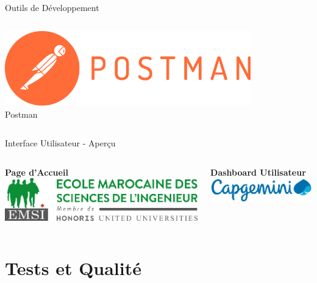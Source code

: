 \documentclass[aspectratio=169]{beamer}
\begin{document}
\begin{frame}{Outils de Développement}
\begin{columns}
        \begin{center}
            \includegraphics[width=0.8\textwidth]{latex_media/media/postman.png}\\
            \small Postman
        \end{center}
    \end{columns}
\end{frame}

\begin{frame}{Interface Utilisateur - Aperçu}
    \begin{columns}
        \begin{center}
            \textbf{Page d'Accueil}\\[0.3cm]
            \includegraphics[width=\textwidth]{latex_media/media/image1.png}
        \end{center}

        \begin{center}
            \textbf{Dashboard Utilisateur}\\[0.3cm]
            \includegraphics[width=\textwidth]{latex_media/media/image2.png}
        \end{center}
    \end{columns}
\end{frame}

\section{Tests et Qualité}
\end{document}
